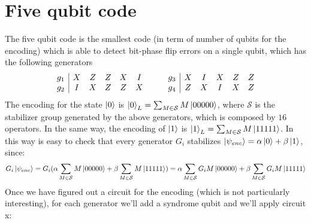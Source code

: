 \documentclass{article}
\begin{document}
	 \section{Five qubit code}
	 The five qubit code is the smallest code (in term of number of qubits for the encoding) which is able to detect bit-phase flip errors on a single qubit, which has the following generators 
	 \[
	 \begin{array}{c|c c c c c}
	 	g_1 & X & Z & Z & X & I\\
	 	g_2 & I & X & Z & Z & X
	 \end{array}\qquad
	 \begin{array}{c|c c c c c}
	 	g_3 & X & I & X & Z & Z\\
	 	g_4 & Z & X & I & X & Z
	 \end{array}
	 \]
	 The encoding for the state $\ket{0}$ is $\ket{0}_L = \sum_{M \in \mathcal{S}}M\ket{00000}$, where $\mathcal{S}$ is the stabilizer group generated by the above generators, which is composed by $16$ operators. In the same way, the encoding of $\ket{1}$ is $\ket{1}_L = \sum_{M \in \mathcal{S}}M\ket{11111}$. In this way is easy to check that every generator $G_i$ stabilizes $\ket{\psi_{enc}} = \alpha\ket{0} + \beta\ket{1}$, since:
	 \[ G_i\ket{\psi_{enc}} = G_i(\alpha\sum_{M \in \mathcal{S}}M\ket{00000} + \beta\sum_{M \in \mathcal{S}}M\ket{11111}) = \alpha\sum_{M \in \mathcal{S}}G_iM\ket{00000} + \beta\sum_{M \in \mathcal{S}}G_iM\ket{11111}\]
	 Once we have figured out a circuit for the encoding (which is not particularly interesting), for each generator we'll add a syndrome qubit and we'll apply circuit x: 
	 \begin{figure}[H]
	 	\centering
	 \end{figure}
\end{document}
